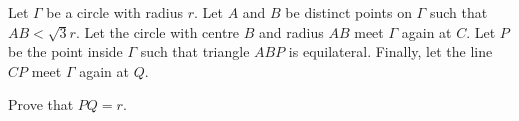 Let $\Gamma$ be a circle with radius $r$.  Let $A$ and $B$ be distinct points on $\Gamma$ such that $AB < \sqrt{3}r$.  Let the circle with centre $B$ and radius $AB$ meet $\Gamma$ again at $C$.  Let $P$ be the point inside $\Gamma$ such that triangle $ABP$ is equilateral.  Finally, let the line $CP$ meet $\Gamma$ again at $Q$.

Prove that $PQ = r$.